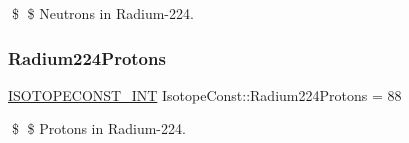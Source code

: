 \$ \$ Neutrons in Radium-\/224. \mbox{\label{group___isotope_const-_radium-_ra224_ga6ebc513a8ffb9a5fb74d5af81f2d2cd4}} 
\subsubsection{\texorpdfstring{Radium224\+Protons}{Radium224Protons}}
{\footnotesize\ttfamily \mbox{\hyperlink{group___isotope_const-_macros_ga5f18360b3e99483a35c32d789e62621c}{I\+S\+O\+T\+O\+P\+E\+C\+O\+N\+S\+T\+\_\+\+I\+NT}} Isotope\+Const\+::\+Radium224\+Protons = 88}

\$ \$ Protons in Radium-\/224. 